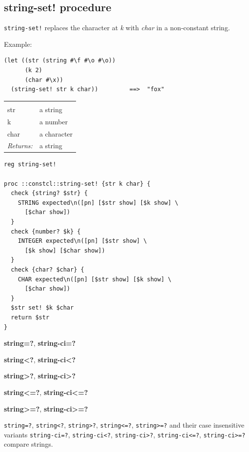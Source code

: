 \documentclass[twoside]{report}
\begin{document}
\subsection{string-set! procedure}
\label{stringset-procedure}

\texttt{string-set!} replaces the character at \emph{k} with \emph{char} in a non-constant string.

Example:

\begin{verbatim}
(let ((str (string #\f #\o #\o))
      (k 2)
      (char #\x))
  (string-set! str k char))         ==>  "fox"
\end{verbatim}

\noindent\begin{tabular}{ |p{1.9cm} p{8cm}| }
\hline
\rowcolor[HTML]{CCCCCC} \multicolumn{2}{|l|}{\bf string-set! (public)} \\
str & a string \\
k & a number \\
char & a character \\
\textit{Returns:} & a string \\
\hline
\end{tabular}

\begin{lstlisting}
reg string-set!

proc ::constcl::string-set! {str k char} {
  check {string? $str} {
    STRING expected\n([pn] [$str show] [$k show] \
      [$char show])
  }
  check {number? $k} {
    INTEGER expected\n([pn] [$str show] \
      [$k show] [$char show])
  }
  check {char? $char} {
    CHAR expected\n([pn] [$str show] [$k show] \
      [$char show])
  }
  $str set! $k $char
  return $str
}
\end{lstlisting}

\textbf{string=?}, \textbf{string-ci=?}

\textbf{string<?}, \textbf{string-ci<?}

\textbf{string>?}, \textbf{string-ci>?}

\textbf{string<=?}, \textbf{string-ci<=?}

\textbf{string>=?}, \textbf{string-ci>=?}

\texttt{string=?}, \texttt{string<?}, \texttt{string>?}, \texttt{string<=?}, \texttt{string>=?} and their case insensitive variants \texttt{string-ci=?}, \texttt{string-ci<?}, \texttt{string-ci>?}, \texttt{string-ci<=?}, \texttt{string-ci>=?} compare strings.
\end{document}
